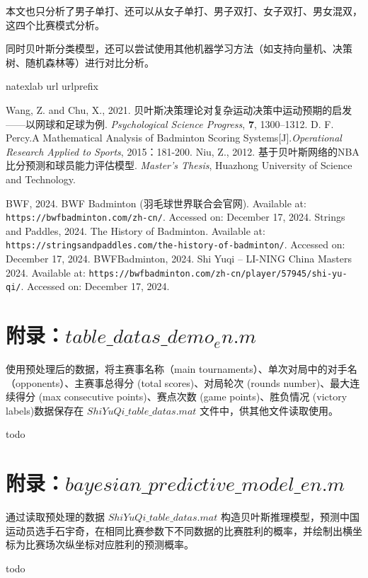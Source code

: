 \documentclass[12pt]{article}
\begin{document}
本文也只分析了男子单打、还可以从女子单打、男子双打、女子双打、男女混双，这四个比赛模式分析。

同时贝叶斯分类模型，还可以尝试使用其他机器学习方法（如支持向量机、决策树、随机森林等）进行对比分析。


\begin{thebibliography}{100}
	\expandafter\ifx\csname natexlab\endcsname\relax\def\natexlab#1{#1}\fi
	\expandafter\ifx\csname url\endcsname\relax
	\def\url#1{\texttt{#1}}\fi
	\expandafter\ifx\csname urlprefix\endcsname\relax\def\urlprefix{URL }\fi

Wang, Z. and Chu, X., 2021. 贝叶斯决策理论对复杂运动决策中运动预期的启发——以网球和足球为例. \textit{Psychological Science Progress}, \textbf{7}, 1300–1312.
D. F. Percy.A Mathematical Analysis of Badminton Scoring Systems[J].\textit{Operational Research Applied to Sports}, 2015：181-200.
Niu, Z., 2012. 基于贝叶斯网络的NBA比分预测和球员能力评估模型. \textit{Master's Thesis}, Huazhong University of Science and Technology.


BWF, 2024. BWF Badminton (羽毛球世界联合会官网). Available at: \url{https://bwfbadminton.com/zh-cn/}. Accessed on: December 17, 2024.
Strings and Paddles, 2024. The History of Badminton. Available at: \url{https://stringsandpaddles.com/the-history-of-badminton/}. Accessed on: December 17, 2024.
BWFBadminton, 2024. Shi Yuqi – LI-NING China Masters 2024. Available at: \url{https://bwfbadminton.com/zh-cn/player/57945/shi-yu-qi/}. Accessed on: December 17, 2024.

\end{thebibliography}

\appendix
\section{附录：$table\_datas\_demo_en.m$}
使用预处理后的数据，将主赛事名称（main tournaments）、单次对局中的对手名（opponents）、主赛事总得分 (total scores)、对局轮次 (rounds number)、最大连续得分 (max consecutive points)、赛点次数 (game points)、胜负情况 (victory labels)数据保存在 $ShiYuQi\_table\_datas.mat$ 文件中，供其他文件读取使用。

todo 


\section{附录：$bayesian\_predictive\_model\_en.m$}
通过读取预处理的数据 $ShiYuQi\_table\_datas.mat$ 构造贝叶斯推理模型，预测中国运动员选手石宇奇，在相同比赛参数下不同数据的比赛胜利的概率，并绘制出横坐标为比赛场次纵坐标对应胜利的预测概率。

todo 
\end{document}
